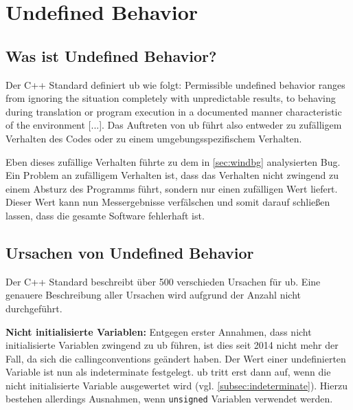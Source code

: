 \chapter{Undefined Behavior}
\label{ch:ub}

\section{Was ist Undefined Behavior?}
\label{sec:ub_was}

Der C++ Standard definiert \gls{ub} wie folgt: \newline
\glqq{}Permissible undefined behavior ranges from ignoring the situation completely with unpredictable results, to behaving during translation or program execution in a
documented manner characteristic of the environment [...]\grqq{}.\cite[S.8]{book:cpp-standard} \newline
Das Auftreten von \gls{ub} führt also entweder zu zufälligem Verhalten des Codes oder zu einem umgebungsspezifischem Verhalten.

Eben dieses zufällige Verhalten führte zu dem in \ref{sec:windbg} analysierten Bug. Ein Problem an zufälligem Verhalten ist, dass das Verhalten nicht zwingend zu einem
Absturz des Programms führt, sondern nur einen zufälligen Wert liefert. Dieser Wert kann nun Messergebnisse verfälschen und somit darauf schließen lassen, dass die gesamte
Software fehlerhaft ist.

\section{Ursachen von Undefined Behavior}
\label{sec:ub_ursachen}

Der C++ Standard\cite{book:cpp-standard} beschreibt über 500 verschieden Ursachen für \gls{ub}. Eine genauere Beschreibung aller Ursachen wird aufgrund der Anzahl nicht durchgeführt.

\textbf{Nicht initialisierte Variablen:} Entgegen erster Annahmen, dass nicht initialisierte Variablen zwingend zu \gls{ub} führen, ist dies seit 2014 nicht mehr der Fall, da sich die
\glspl{callingconvention} geändert haben. Der Wert einer undefinierten Variable ist nun als \glqq{}indeterminate\grqq{} festgelegt\cite[S.63]{book:cpp-standard}.
\gls{ub} tritt erst dann auf, wenn die nicht initialisierte Variable ausgewertet wird (vgl. \ref{subsec:indeterminate}). Hierzu bestehen allerdings Ausnahmen, wenn \verb|unsigned|
Variablen verwendet werden. \cite[S.63]{book:cpp-standard}

